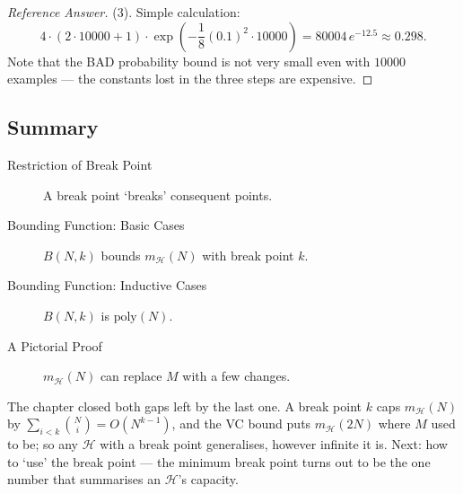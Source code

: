 \begin{proof}[Reference Answer]
    (3). Simple calculation:
    \[
        4 \cdot (2 \cdot 10000 + 1) \cdot \exp \left( -\frac{1}{8} (0.1)^2
        \cdot 10000 \right)
        = 80004 \, e^{-12.5} \approx 0.298 .
    \]
    Note that the BAD probability bound is not very small even with \(10000\)
    examples --- the constants lost in the three steps are expensive.
\end{proof}

\hrulebar

\subsection*{Summary}

\begin{description}
    \item[Restriction of Break Point] A break point `breaks' consequent points.
    \item[Bounding Function: Basic Cases] \(B(N, k)\) bounds
        \(m_{\mathcal{H}}(N)\) with break point \(k\).
    \item[Bounding Function: Inductive Cases] \(B(N, k)\) is
        \(\mathrm{poly}(N)\).
    \item[A Pictorial Proof] \(m_{\mathcal{H}}(N)\) can replace \(M\) with a
        few changes.
\end{description}

The chapter closed both gaps left by the last one. A break point \(k\) caps
\(m_{\mathcal{H}}(N)\) by \(\sum_{i<k} \binom{N}{i} = O(N^{k-1})\), and the VC
bound puts \(m_{\mathcal{H}}(2N)\) where \(M\) used to be; so any
\(\mathcal{H}\) with a break point generalises, however infinite it is. Next:
how to `use' the break point --- the minimum break point turns out to be the
one number that summarises an \(\mathcal{H}\)'s capacity.
